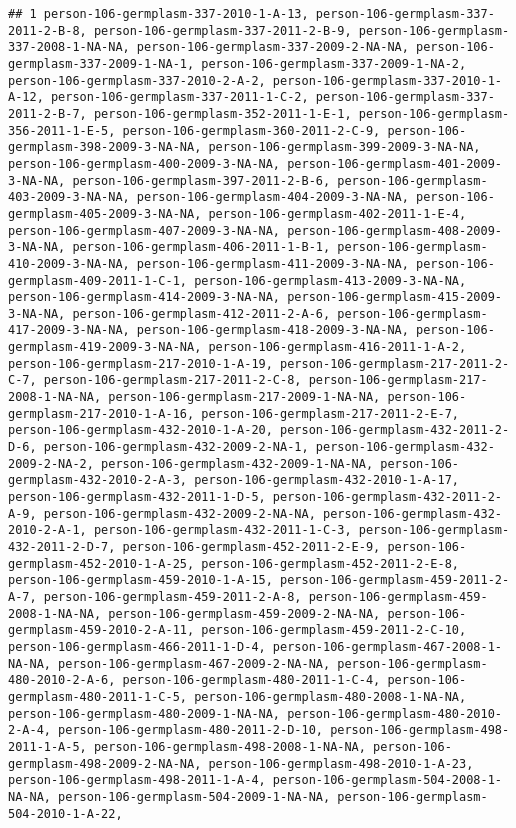 \documentclass{article}\usepackage[]{graphicx}\usepackage[]{color}
\makeatletter
\newenvironment{kframe}{%
 \def\at@end@of@kframe{}%
 \ifinner\ifhmode%
  \def\at@end@of@kframe{\end{minipage}}%
  \begin{minipage}{\columnwidth}%
 \fi\fi%
 \def\FrameCommand##1{\hskip\@totalleftmargin \hskip-\fboxsep
 \colorbox{shadecolor}{##1}\hskip-\fboxsep
     \hskip-\linewidth \hskip-\@totalleftmargin \hskip\columnwidth}%
 \MakeFramed {\advance\hsize-\width
   \@totalleftmargin\z@ \linewidth\hsize
   \@setminipage}}%
 {\par\unskip\endMakeFramed%
 \at@end@of@kframe}
\newenvironment{knitrout}{}{} %
\makeatother
\begin{document}
\begin{itemize}
\begin{itemize}
\begin{knitrout}
\begin{kframe}
\begin{verbatim}
## 1 person-106-germplasm-337-2010-1-A-13, person-106-germplasm-337-2011-2-B-8, person-106-germplasm-337-2011-2-B-9, person-106-germplasm-337-2008-1-NA-NA, person-106-germplasm-337-2009-2-NA-NA, person-106-germplasm-337-2009-1-NA-1, person-106-germplasm-337-2009-1-NA-2, person-106-germplasm-337-2010-2-A-2, person-106-germplasm-337-2010-1-A-12, person-106-germplasm-337-2011-1-C-2, person-106-germplasm-337-2011-2-B-7, person-106-germplasm-352-2011-1-E-1, person-106-germplasm-356-2011-1-E-5, person-106-germplasm-360-2011-2-C-9, person-106-germplasm-398-2009-3-NA-NA, person-106-germplasm-399-2009-3-NA-NA, person-106-germplasm-400-2009-3-NA-NA, person-106-germplasm-401-2009-3-NA-NA, person-106-germplasm-397-2011-2-B-6, person-106-germplasm-403-2009-3-NA-NA, person-106-germplasm-404-2009-3-NA-NA, person-106-germplasm-405-2009-3-NA-NA, person-106-germplasm-402-2011-1-E-4, person-106-germplasm-407-2009-3-NA-NA, person-106-germplasm-408-2009-3-NA-NA, person-106-germplasm-406-2011-1-B-1, person-106-germplasm-410-2009-3-NA-NA, person-106-germplasm-411-2009-3-NA-NA, person-106-germplasm-409-2011-1-C-1, person-106-germplasm-413-2009-3-NA-NA, person-106-germplasm-414-2009-3-NA-NA, person-106-germplasm-415-2009-3-NA-NA, person-106-germplasm-412-2011-2-A-6, person-106-germplasm-417-2009-3-NA-NA, person-106-germplasm-418-2009-3-NA-NA, person-106-germplasm-419-2009-3-NA-NA, person-106-germplasm-416-2011-1-A-2, person-106-germplasm-217-2010-1-A-19, person-106-germplasm-217-2011-2-C-7, person-106-germplasm-217-2011-2-C-8, person-106-germplasm-217-2008-1-NA-NA, person-106-germplasm-217-2009-1-NA-NA, person-106-germplasm-217-2010-1-A-16, person-106-germplasm-217-2011-2-E-7, person-106-germplasm-432-2010-1-A-20, person-106-germplasm-432-2011-2-D-6, person-106-germplasm-432-2009-2-NA-1, person-106-germplasm-432-2009-2-NA-2, person-106-germplasm-432-2009-1-NA-NA, person-106-germplasm-432-2010-2-A-3, person-106-germplasm-432-2010-1-A-17, person-106-germplasm-432-2011-1-D-5, person-106-germplasm-432-2011-2-A-9, person-106-germplasm-432-2009-2-NA-NA, person-106-germplasm-432-2010-2-A-1, person-106-germplasm-432-2011-1-C-3, person-106-germplasm-432-2011-2-D-7, person-106-germplasm-452-2011-2-E-9, person-106-germplasm-452-2010-1-A-25, person-106-germplasm-452-2011-2-E-8, person-106-germplasm-459-2010-1-A-15, person-106-germplasm-459-2011-2-A-7, person-106-germplasm-459-2011-2-A-8, person-106-germplasm-459-2008-1-NA-NA, person-106-germplasm-459-2009-2-NA-NA, person-106-germplasm-459-2010-2-A-11, person-106-germplasm-459-2011-2-C-10, person-106-germplasm-466-2011-1-D-4, person-106-germplasm-467-2008-1-NA-NA, person-106-germplasm-467-2009-2-NA-NA, person-106-germplasm-480-2010-2-A-6, person-106-germplasm-480-2011-1-C-4, person-106-germplasm-480-2011-1-C-5, person-106-germplasm-480-2008-1-NA-NA, person-106-germplasm-480-2009-1-NA-NA, person-106-germplasm-480-2010-2-A-4, person-106-germplasm-480-2011-2-D-10, person-106-germplasm-498-2011-1-A-5, person-106-germplasm-498-2008-1-NA-NA, person-106-germplasm-498-2009-2-NA-NA, person-106-germplasm-498-2010-1-A-23, person-106-germplasm-498-2011-1-A-4, person-106-germplasm-504-2008-1-NA-NA, person-106-germplasm-504-2009-1-NA-NA, person-106-germplasm-504-2010-1-A-22, 
\end{verbatim}
\end{kframe}
\end{knitrout}
\end{itemize}
\end{itemize}
\end{document}
